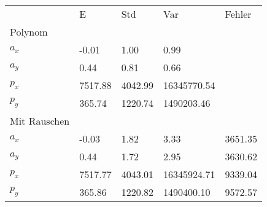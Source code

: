 \begin{tabular}{l|l|l|l|l}

         & E       & Std    & Var    & Fehler \\ 

\hhline{=|=|=|=|=}
Polynom & & & & \\ 

$a_x$  &        -0.01 &         1.00 &         0.99 & \\ 

$a_y$  &         0.44 &         0.81 &         0.66 & \\ 

$p_x$  &      7517.88 &      4042.99 &  16345770.54 & \\ 

$p_y$  &       365.74 &      1220.74 &   1490203.46 & \\ 

\hline 

Mit Rauschen & & & & \\ 

$a_x$  &        -0.03 &         1.82 &         3.33 &      3651.35 \\ 

$a_y$  &         0.44 &         1.72 &         2.95 &      3630.62 \\ 

$p_x$  &      7517.77 &      4043.01 &  16345924.71 &      9339.04 \\ 

$p_y$  &       365.86 &      1220.82 &   1490400.10 &      9572.57 \\ 

\end{tabular}

